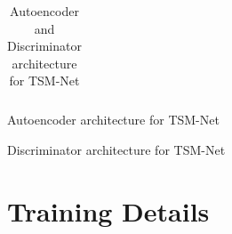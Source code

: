 \documentclass[12pt]{article}
\begin{document}
\begin{appendices}
\begin{table}[ht]
\begin{subtable}{.49\linewidth}
{\begin{tabular}{c}
      \bottomrule
  \end{tabular}
  }
	\caption{Autoencoder architecture for TSM-Net }
  \end{subtable}
  \begin{subtable}{.49\linewidth}
	\caption{Discriminator architecture for TSM-Net }
  \end{subtable}
\caption{Autoencoder and Discriminator architecture for TSM-Net}
\label{tab:arch-a-d}
\end{table}

\section{Training Details}


\end{appendices}
\end{document}
